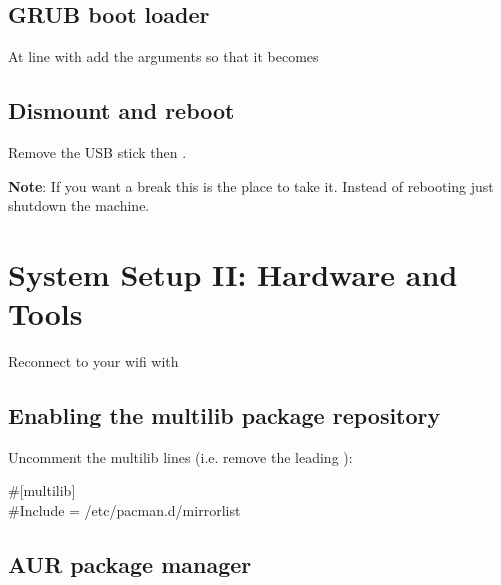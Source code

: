 
\subsection{GRUB boot loader}

\begin{blocksection}
    At line with  add the arguments so that it becomes\\
\end{blocksection}

\subsection{Dismount and reboot}


Remove the USB stick then .

\textbf{Note}: If you want a break this is the place to take it. Instead of rebooting just shutdown the machine.

\section{System Setup II: Hardware and Tools}

Reconnect to your wifi with 

\subsection{Enabling the multilib package repository}

\begin{blocksection}
    Uncomment the multilib lines (i.e. remove the leading \code{\#}):
    \begin{codeblock}
        \#[multilib]\\
        \#Include = /etc/pacman.d/mirrorlist
    \end{codeblock}
\end{blocksection}

\subsection{AUR package manager}

